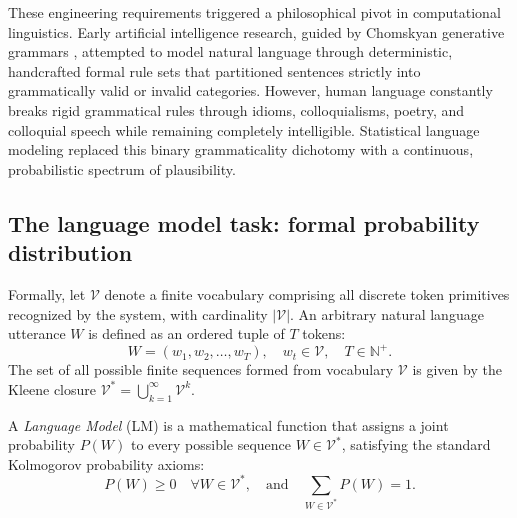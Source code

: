 \documentclass[../../../main.tex]{subfiles}
\begin{document}
These engineering requirements triggered a philosophical pivot in computational linguistics. Early artificial intelligence research, guided by Chomskyan generative grammars \citep{manning1999}, attempted to model natural language through deterministic, handcrafted formal rule sets that partitioned sentences strictly into grammatically valid or invalid categories. However, human language constantly breaks rigid grammatical rules through idioms, colloquialisms, poetry, and colloquial speech while remaining completely intelligible. Statistical language modeling replaced this binary grammaticality dichotomy with a continuous, probabilistic spectrum of plausibility.

\subsection{The language model task: formal probability distribution}
\label{subsec:lm_formal_distribution}

Formally, let $\mathcal{V}$ denote a finite vocabulary comprising all discrete token primitives recognized by the system, with cardinality $|\mathcal{V}|$. An arbitrary natural language utterance $W$ is defined as an ordered tuple of $T$ tokens:
\begin{equation}
W = \left(w_1, w_2, \dots, w_T\right), \quad w_t \in \mathcal{V}, \quad T \in \mathbb{N}^+.
\end{equation}
The set of all possible finite sequences formed from vocabulary $\mathcal{V}$ is given by the Kleene closure $\mathcal{V}^* = \bigcup_{k=1}^\infty \mathcal{V}^k$.

A \textit{Language Model} (LM) is a mathematical function that assigns a joint probability $P(W)$ to every possible sequence $W \in \mathcal{V}^*$, satisfying the standard Kolmogorov probability axioms:
\begin{equation}
P(W) \ge 0 \quad \forall W \in \mathcal{V}^*, \quad \text{and} \quad \sum_{W \in \mathcal{V}^*} P(W) = 1.
\label{eq:kolmogorov_lm}
\end{equation}
\end{document}
